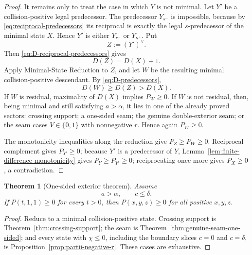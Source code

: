 \documentclass[11pt]{article}
\newtheorem{theorem}{Theorem}[section]
\theoremstyle{definition}
\begin{document}
\begin{proof}
It remains only to treat the case in which \(Y\) is not minimal.  Let \(Y'\) be a collision-positive legal predecessor.  The predecessor \(Y_{s^-}\) is impossible, because by \eqref{eq:reciprocal-predecessors} its reciprocal is exactly the legal \(s\)-predecessor of the minimal state \(X\).  Hence \(Y'\) is either \(Y_{r^-}\) or \(Y_{\kappa^+}\).  Put
\begin{equation*}
Z:=(Y')^\vee.
\end{equation*}
Then \eqref{eq:D-reciprocal-predecessors} gives
\begin{equation*}
D(Z)=D(X)+1.
\end{equation*}
Apply Minimal-State Reduction to \(Z\), and let \(W\) be the resulting minimal collision-positive descendant.  By \eqref{eq:D-predecessors},
\begin{equation*}
D(W)\ge D(Z)>D(X).
\end{equation*}
If \(W\) is residual, maximality of \(D(X)\) implies \(P_W\ge0\).  If \(W\) is not residual, then, being minimal and still satisfying \(a>\alpha\), it lies in one of the already proved sectors: crossing support; a one-sided seam; the genuine double-exterior seam; or the seam cases \(V\in\{0,1\}\) with nonnegative \(r\).  Hence again \(P_W\ge0\).

The monotonicity inequalities along the reduction give \(P_Z\ge P_W\ge0\).  Reciprocal complement gives \(P_{Y'}\ge0\); because \(Y'\) is a predecessor of \(Y\), Lemma~\ref{lem:finite-difference-monotonicity} gives \(P_Y\ge P_{Y'}\ge0\); reciprocating once more gives \(P_X\ge0\), a contradiction.
\end{proof}

\begin{theorem}[One-sided exterior theorem]
\label{thm:core}
Assume
\begin{equation*}
a>\alpha,
\qquad c\le\delta.
\end{equation*}
If \(P(t,1,1)\ge0\) for every \(t>0\), then \(P(x,y,z)\ge0\) for all positive \(x,y,z\).
\end{theorem}

\begin{proof}
Reduce to a minimal collision-positive state.  Crossing support is Theorem~\ref{thm:crossing-support}; the seam is Theorem~\ref{thm:genuine-seam-one-sided}; and every state with \(\chi\le0\), including the boundary slices \(c=0\) and \(c=\delta\), is Proposition~\ref{prop:partii-negative-r}.  These cases are exhaustive.
\end{proof}
\end{document}

